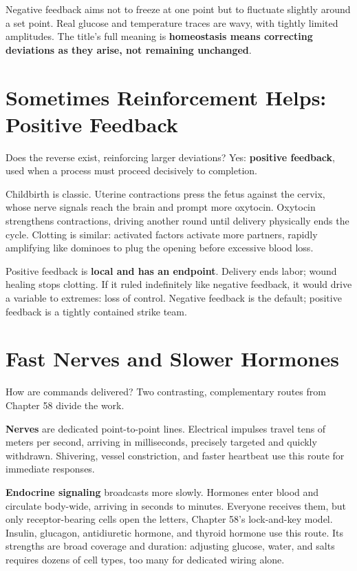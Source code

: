Negative feedback aims not to freeze at one point but to fluctuate slightly around a set point. Real glucose and temperature traces are wavy, with tightly limited amplitudes. The title's full meaning is \textbf{homeostasis means correcting deviations as they arise, not remaining unchanged}.

\section{Sometimes Reinforcement Helps: Positive Feedback}

Does the reverse exist, reinforcing larger deviations? Yes: \textbf{positive feedback}, used when a process must proceed decisively to completion.

Childbirth is classic. Uterine contractions press the fetus against the cervix, whose nerve signals reach the brain and prompt more oxytocin. Oxytocin strengthens contractions, driving another round until delivery physically ends the cycle. Clotting is similar: activated factors activate more partners, rapidly amplifying like dominoes to plug the opening before excessive blood loss.

Positive feedback is \textbf{local and has an endpoint}. Delivery ends labor; wound healing stops clotting. If it ruled indefinitely like negative feedback, it would drive a variable to extremes: loss of control. Negative feedback is the default; positive feedback is a tightly contained strike team.

\section{Fast Nerves and Slower Hormones}

How are commands delivered? Two contrasting, complementary routes from Chapter 58 divide the work.

\textbf{Nerves} are dedicated point-to-point lines. Electrical impulses travel tens of meters per second, arriving in milliseconds, precisely targeted and quickly withdrawn. Shivering, vessel constriction, and faster heartbeat use this route for immediate responses.

\textbf{Endocrine signaling} broadcasts more slowly. Hormones enter blood and circulate body-wide, arriving in seconds to minutes. Everyone receives them, but only receptor-bearing cells open the letters, Chapter 58's lock-and-key model. Insulin, glucagon, antidiuretic hormone, and thyroid hormone use this route. Its strengths are broad coverage and duration: adjusting glucose, water, and salts requires dozens of cell types, too many for dedicated wiring alone.

